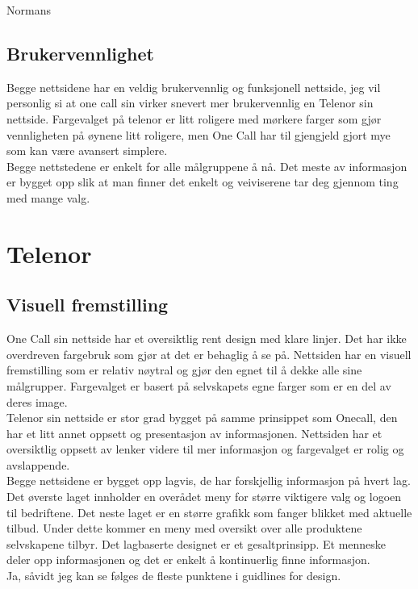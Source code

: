 \documentclass[a4paper, 10pt]{article}
\begin{document}
Normans

\subsection*{Brukervennlighet}
Begge nettsidene har en veldig brukervennlig og funksjonell nettside, jeg vil personlig si at one call sin virker snevert mer brukervennlig en Telenor sin nettside. Fargevalget på telenor er litt roligere med mørkere farger som gjør vennligheten på øynene litt roligere, men One Call har til gjengjeld gjort mye som kan være avansert simplere.\\

Begge nettstedene er enkelt for alle målgruppene å nå. Det meste av informasjon er bygget opp slik at man finner det enkelt og veiviserene tar deg gjennom ting med mange valg.

\section*{Telenor}
\subsection*{Visuell fremstilling}
One Call sin nettside har et oversiktlig rent design med klare linjer. Det har ikke overdreven fargebruk som gjør at det er behaglig å se på. Nettsiden har en visuell fremstilling som er relativ nøytral og gjør den egnet til å dekke alle sine målgrupper. Fargevalget er basert på selvskapets egne farger som er en del av deres image.\\

Telenor sin nettside er stor grad bygget på samme prinsippet som Onecall, den har et litt annet oppsett og presentasjon av informasjonen. Nettsiden har et oversiktlig oppsett av lenker videre til mer informasjon og fargevalget er rolig og avslappende.\\

Begge nettsidene er bygget opp lagvis, de har forskjellig informasjon på hvert lag. Det øverste laget innholder en overådet meny for større viktigere valg og logoen til bedriftene. Det neste laget er en større grafikk som fanger blikket med aktuelle tilbud. Under dette kommer en meny med oversikt over alle produktene selvskapene tilbyr. Det lagbaserte designet er et gesaltprinsipp. Et menneske deler opp informasjonen og det er enkelt å kontinuerlig finne informasjon.\\

Ja, såvidt jeg kan se følges de fleste punktene i guidlines for design.
\end{document}
